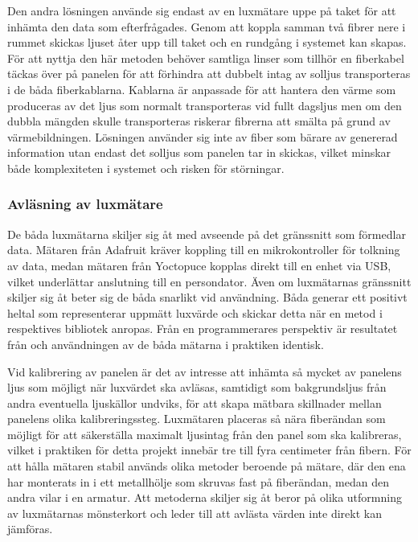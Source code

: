             Den andra lösningen använde sig endast av en luxmätare uppe på taket för att inhämta den data som efterfrågades. Genom att koppla samman två fibrer nere i rummet skickas ljuset åter upp till taket och en rundgång i systemet kan skapas. För att nyttja den här metoden behöver samtliga linser som tillhör en fiberkabel täckas över på panelen för att förhindra att dubbelt intag av solljus transporteras i de båda fiberkablarna. Kablarna är anpassade för att hantera den värme som produceras av det ljus som normalt transporteras vid fullt dagsljus men om den dubbla mängden skulle transporteras riskerar fibrerna att smälta på grund av värmebildningen. Lösningen använder sig inte av fiber som bärare av genererad information utan endast det solljus som panelen tar in skickas, vilket minskar både komplexiteten i systemet och risken för störningar.

        \subsubsection{Avläsning av luxmätare} %
        \label{ssub:avlasning_av_luxmatare}
            De båda luxmätarna skiljer sig åt med avseende på det gränssnitt som förmedlar data. Mätaren från Adafruit kräver koppling till en mikrokontroller för tolkning av data, medan mätaren från Yoctopuce kopplas direkt till en enhet via USB, vilket underlättar anslutning till en persondator. Även om luxmätarnas gränssnitt skiljer sig åt beter sig de båda snarlikt vid användning. Båda generar ett positivt heltal som representerar uppmätt luxvärde och skickar detta när en metod i respektives bibliotek anropas. Från en programmerares perspektiv är resultatet från och användningen av de båda mätarna i praktiken identisk.\bigskip

            Vid kalibrering av panelen är det av intresse att inhämta så mycket av panelens ljus som möjligt när luxvärdet ska avläsas, samtidigt som bakgrundsljus från andra eventuella ljuskällor undviks, för att skapa mätbara skillnader mellan panelens olika kalibreringssteg. Luxmätaren placeras så nära fiberändan som möjligt för att säkerställa maximalt ljusintag från den panel som ska kalibreras, vilket i praktiken för detta projekt innebär tre till fyra centimeter från fibern. För att hålla mätaren stabil används olika metoder beroende på mätare, där den ena har monterats in i ett metallhölje som skruvas fast på fiberändan, medan den andra vilar i en armatur. Att metoderna skiljer sig åt beror på olika utformning av luxmätarnas mönsterkort och leder till att avlästa värden inte direkt kan jämföras.\bigskip 

